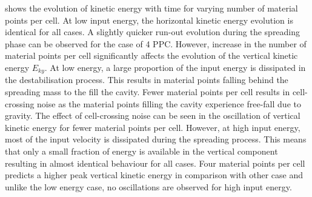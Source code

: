  shows the evolution of kinetic energy with time for varying 
number of material points per cell. At low input energy, the horizontal kinetic 
energy evolution is identical for all cases. A slightly quicker run-out 
evolution during the spreading phase can be observed for the case of 4 PPC.  
However, increase in the number of material points per cell significantly 
affects the evolution of the vertical kinetic energy $E_{ky}$. At low energy, a 
large proportion of the input energy is dissipated in the destabilisation 
process. This results in material points falling behind the spreading mass to 
the fill the cavity. Fewer material points per cell results in cell-crossing 
noise as the material points filling the cavity experience free-fall due to 
gravity. The effect of cell-crossing noise can be seen in the oscillation of 
vertical kinetic energy for fewer material points per cell. However, at high 
input energy, most of the input velocity is dissipated during the spreading 
process. This means that only a small fraction of energy is available in the 
vertical component resulting in almost identical behaviour for all cases. Four 
material points per cell predicts a higher peak vertical kinetic energy in 
comparison with other case and unlike the low energy case, no oscillations are 
observed for high input energy.

